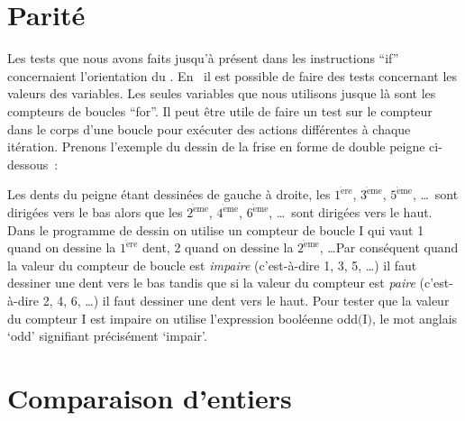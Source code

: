 \section{Parité}
Les tests que nous avons faits jusqu'à présent dans les instructions
``if'' concernaient l'orientation du \robot.  En \pascal\ il est
possible de faire des tests concernant les valeurs des variables.  Les
seules variables que nous utilisons jusque là sont les compteurs de
boucles ``for''.  Il peut être utile de faire un test sur le compteur
dans le corps d'une boucle pour exécuter des actions différentes à
chaque itération.  Prenons l'exemple du dessin de la frise en forme de
double peigne ci-dessous~:

 {\raggedright 
   }

Les dents du peigne étant dessinées de gauche à droite, les
$1^{\mathrm{\grave{e}re}}$, $3^{\mathrm{\grave{e}me}}$,
$5^{\mathrm{\grave{e}me}}$, \ldots\ sont dirigées vers le bas alors
que les $2^{\mathrm{\grave{e}me}}$, $4^{\mathrm{\grave{e}me}}$,
$6^{\mathrm{\grave{e}me}}$, \ldots\ sont dirigées vers le haut.  Dans
le programme de dessin on utilise un compteur de boucle {\idt I} qui
vaut 1 quand on dessine la $1^{\mathrm{\grave{e}re}}$ dent, 2 quand on
dessine la $2^{\mathrm{\grave{e}me}}$, \ldots Par conséquent quand la
valeur du compteur de boucle est {\em impaire} (c'est-à-dire 1, 3, 5,
\ldots) il faut dessiner une dent vers le bas tandis que si la valeur
du compteur est {\em paire} (c'est-à-dire 2, 4, 6, \ldots) il faut
dessiner une dent vers le haut.  Pour tester que la
valeur du compteur {\idt I} est impaire on utilise l'expression
booléenne {\idt odd$($I$)$}, le mot anglais `odd' signifiant
précisément `impair'.



\section{Comparaison d'entiers}

